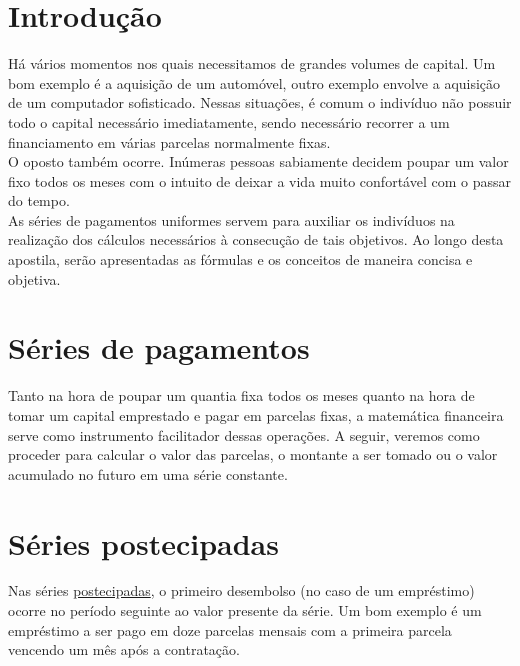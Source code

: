 \documentclass[
	article,			%
	11pt,				%
	oneside,			%
	a4paper,			%
	english,			%
	brazil,				%
	sumario=tradicional
	]{abntex2}
\begin{document}
\section{Introdução}

Há vários momentos nos quais necessitamos de grandes volumes de capital. Um bom exemplo é a aquisição de um automóvel, outro exemplo envolve a aquisição de um computador sofisticado. Nessas situações, é comum o indivíduo não possuir todo o capital necessário imediatamente, sendo necessário recorrer a um financiamento em várias parcelas normalmente fixas.\\
\indent O oposto também ocorre. Inúmeras pessoas sabiamente decidem poupar um valor fixo todos os meses com o intuito de deixar a vida muito confortável com o passar do tempo.\\
\indent As séries de pagamentos uniformes servem para auxiliar os indivíduos na realização dos cálculos necessários à consecução de tais objetivos. Ao longo desta apostila, serão apresentadas as fórmulas e os conceitos de maneira concisa e objetiva.

\section{Séries de pagamentos}

Tanto na hora de poupar um quantia fixa todos os meses quanto na hora de tomar um capital emprestado e pagar em parcelas fixas, a matemática financeira serve como instrumento facilitador dessas operações. A seguir, veremos como proceder para calcular o valor das parcelas, o montante a ser tomado ou o valor acumulado no futuro em uma série constante.

\section{Séries postecipadas}

Nas séries \underline{postecipadas}, o primeiro desembolso (no caso de um empréstimo) ocorre no período seguinte ao valor presente da série. Um bom exemplo é um empréstimo a ser pago em doze parcelas mensais com a primeira parcela vencendo um mês após a contratação.
\end{document}
